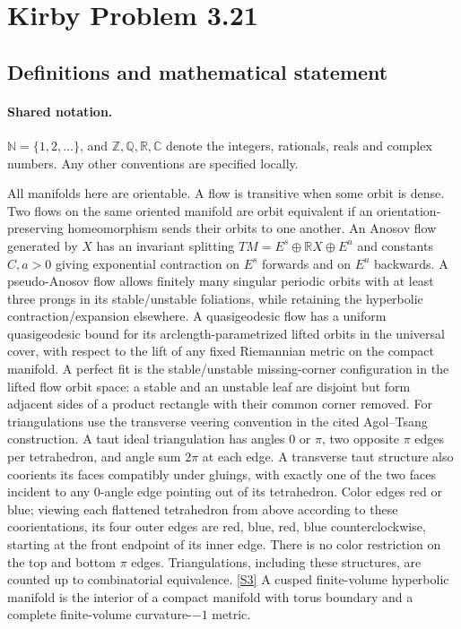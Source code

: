 \documentclass[11pt]{article}
\newcommand{\sref}[2]{\hyperlink{source:#1:#2}{[S#2]}}
\begin{document}
\section{Kirby Problem 3.21}\label{statement}

\subsection{Definitions and mathematical statement}

\paragraph{Shared notation.}$\mathbb N=\{1,2,\ldots\}$, and $\mathbb Z,\mathbb Q,\mathbb R,\mathbb C$ denote the integers, rationals, reals and complex numbers. Any other conventions are specified locally.


All manifolds here are orientable. A flow is transitive when some orbit is dense. Two flows on the same oriented manifold are orbit equivalent if an orientation-preserving homeomorphism sends their orbits to one another. An Anosov flow generated by $X$ has an invariant splitting $TM=E^s\oplus\mathbb RX\oplus E^u$ and constants $C,a>0$ giving exponential contraction on $E^s$ forwards and on $E^u$ backwards. A pseudo-Anosov flow allows finitely many singular periodic orbits with at least three prongs in its stable/unstable foliations, while retaining the hyperbolic contraction/expansion elsewhere. A quasigeodesic flow has a uniform quasigeodesic bound for its arclength-parametrized lifted orbits in the universal cover, with respect to the lift of any fixed Riemannian metric on the compact manifold. A perfect fit is the stable/unstable missing-corner configuration in the lifted flow orbit space: a stable and an unstable leaf are disjoint but form adjacent sides of a product rectangle with their common corner removed.
For triangulations use the transverse veering convention in the cited Agol--Tsang construction. A taut ideal triangulation has angles $0$ or $\pi$, two opposite $\pi$ edges per tetrahedron, and angle sum $2\pi$ at each edge. A transverse taut structure also coorients its faces compatibly under gluings, with exactly one of the two faces incident to any $0$-angle edge pointing out of its tetrahedron. Color edges red or blue; viewing each flattened tetrahedron from above according to these coorientations, its four outer edges are red, blue, red, blue counterclockwise, starting at the front endpoint of its inner edge. There is no color restriction on the top and bottom $\pi$ edges. Triangulations, including these structures, are counted up to combinatorial equivalence. \sref{statement}{3} A cusped finite-volume hyperbolic manifold is the interior of a compact manifold with torus boundary and a complete finite-volume curvature-$-1$ metric.
\end{document}

